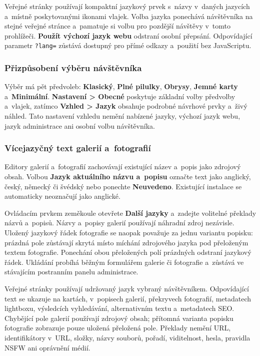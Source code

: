 \documentclass[11pt,a4paper]{article}
\newcommand{\ui}[1]{\textbf{#1}}
\newcommand{\codeword}[1]{\nolinkurl{#1}}
\begin{document}
Veřejné stránky používají kompaktní jazykový prvek s~názvy v~daných jazycích
a~místně poskytovanými ikonami vlajek. Volba jazyka ponechává návštěvníka na
stejné veřejné stránce a~pamatuje si volbu pro pozdější návštěvy v~tomto
prohlížeči. \ui{Použít výchozí jazyk webu} odstraní osobní přepsání.
Odpovídající parametr \codeword{?lang=} zůstává dostupný pro přímé odkazy
a~použití bez JavaScriptu.

\subsubsection{Přizpůsobení výběru návštěvníka}

Výběr má pět předvoleb: \ui{Klasický}, \ui{Plné pilulky}, \ui{Obrysy}, \ui{Jemné
karty} a~\ui{Minimální}. \ui{Nastavení > Obecné} poskytuje základní volby
předvolby a~vlajek, zatímco \ui{Vzhled > Jazyk} obsahuje podrobné návrhové prvky
a~živý náhled. Tato nastavení vzhledu nemění nabízené jazyky, výchozí jazyk
webu, jazyk administrace ani osobní volbu návštěvníka.

\subsubsection{Vícejazyčný text galerií a~fotografií}

Editory galerií a~fotografií zachovávají existující název a~popis jako zdrojový
obsah. Volbou \ui{Jazyk aktuálního názvu a~popisu} označte text jako anglický,
český, německý či švédský nebo ponechte \ui{Neuvedeno}. Existující instalace se
automaticky neoznačují jako anglické.

Ovládacím prvkem zeměkoule otevřete \ui{Další jazyky} a~zadejte volitelné
překlady názvů a~popisů. Názvy a~popisy galerií používají náhradní zdroj
nezávisle. Uložený jazykový řádek fotografie se naopak považuje za jednu
variantu popisku: prázdná pole zůstávají skrytá místo míchání zdrojového jazyka
pod přeloženým textem fotografie. Ponechání obou přeložených polí prázdných
odstraní jazykový řádek. Ukládání probíhá běžným formulářem galerie či
fotografie a~zůstává ve stávajícím postranním panelu administrace.

Veřejné stránky používají udržovaný jazyk vybraný návštěvníkem. Odpovídající
text se ukazuje na kartách, v~popisech galerií, překryvech fotografií,
metadatech lightboxu, výsledcích vyhledávání, alternativním textu a~metadatech
SEO. Chybějící pole galerií používají zdrojový obsah; přítomná varianta popisku
fotografie zobrazuje pouze uložená přeložená pole. Překlady nemění URL,
identifikátory v~URL, složky, názvy souborů, pořadí, viditelnost, hesla,
pravidla NSFW ani oprávnění médií.
\end{document}
